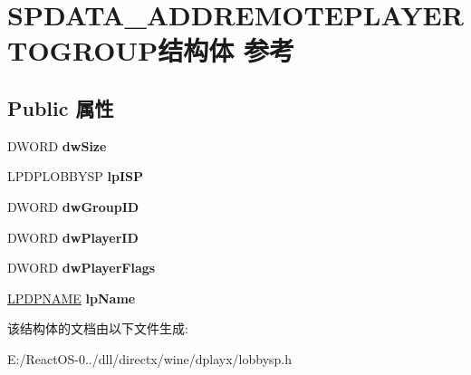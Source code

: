 \hypertarget{struct_s_p_d_a_t_a___a_d_d_r_e_m_o_t_e_p_l_a_y_e_r_t_o_g_r_o_u_p}{}\section{S\+P\+D\+A\+T\+A\+\_\+\+A\+D\+D\+R\+E\+M\+O\+T\+E\+P\+L\+A\+Y\+E\+R\+T\+O\+G\+R\+O\+U\+P结构体 参考}
\label{struct_s_p_d_a_t_a___a_d_d_r_e_m_o_t_e_p_l_a_y_e_r_t_o_g_r_o_u_p}
\subsection*{Public 属性}
\begin{DoxyCompactItemize}
\item 
\mbox{\label{struct_s_p_d_a_t_a___a_d_d_r_e_m_o_t_e_p_l_a_y_e_r_t_o_g_r_o_u_p_a504b783960c83458c541be17f4a53258}} 
D\+W\+O\+RD {\bfseries dw\+Size}
\item 
\mbox{\label{struct_s_p_d_a_t_a___a_d_d_r_e_m_o_t_e_p_l_a_y_e_r_t_o_g_r_o_u_p_ac2b65dad9a0ba178084b534eb2e764cd}} 
L\+P\+D\+P\+L\+O\+B\+B\+Y\+SP {\bfseries lp\+I\+SP}
\item 
\mbox{\label{struct_s_p_d_a_t_a___a_d_d_r_e_m_o_t_e_p_l_a_y_e_r_t_o_g_r_o_u_p_ab9e5e061e8effc6a33a99451e46cb117}} 
D\+W\+O\+RD {\bfseries dw\+Group\+ID}
\item 
\mbox{\label{struct_s_p_d_a_t_a___a_d_d_r_e_m_o_t_e_p_l_a_y_e_r_t_o_g_r_o_u_p_a19c6fe2d03d1979cc9ca0e63d133ab49}} 
D\+W\+O\+RD {\bfseries dw\+Player\+ID}
\item 
\mbox{\label{struct_s_p_d_a_t_a___a_d_d_r_e_m_o_t_e_p_l_a_y_e_r_t_o_g_r_o_u_p_a98e647cbe9d6e6b43909202fc26d693b}} 
D\+W\+O\+RD {\bfseries dw\+Player\+Flags}
\item 
\mbox{\label{struct_s_p_d_a_t_a___a_d_d_r_e_m_o_t_e_p_l_a_y_e_r_t_o_g_r_o_u_p_a0b6b2b7fcc65b2a215a2054e91e207dd}} 
\hyperlink{structtag_d_p_n_a_m_e}{L\+P\+D\+P\+N\+A\+ME} {\bfseries lp\+Name}
\end{DoxyCompactItemize}


该结构体的文档由以下文件生成\+:\begin{DoxyCompactItemize}
\item 
E\+:/\+React\+O\+S-\/0../dll/directx/wine/dplayx/lobbysp.\+h\end{DoxyCompactItemize}
